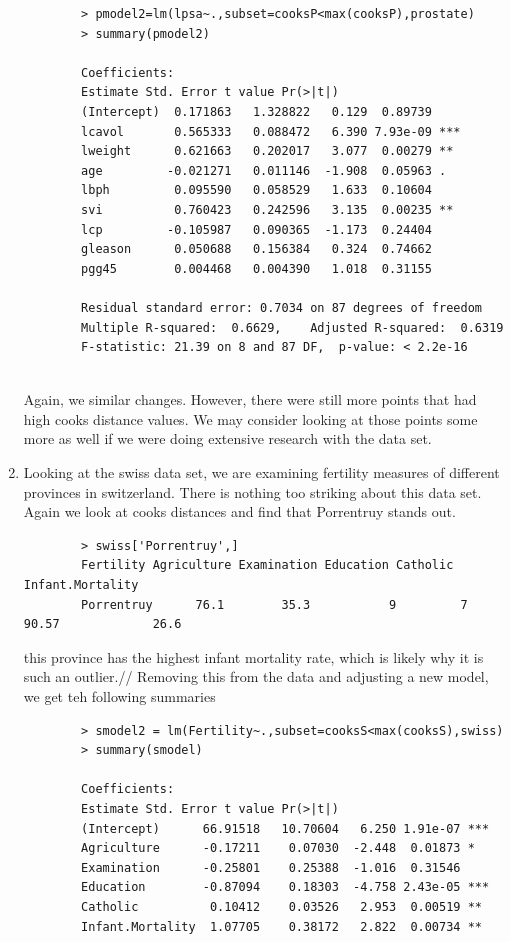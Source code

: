 \documentclass[11pt]{article}
\begin{document}
\begin{enumerate}
\begin{verbatim}
		> pmodel2=lm(lpsa~.,subset=cooksP<max(cooksP),prostate)
		> summary(pmodel2)
		
		Coefficients:
		Estimate Std. Error t value Pr(>|t|)    
		(Intercept)  0.171863   1.328822   0.129  0.89739    
		lcavol       0.565333   0.088472   6.390 7.93e-09 ***
		lweight      0.621663   0.202017   3.077  0.00279 ** 
		age         -0.021271   0.011146  -1.908  0.05963 .  
		lbph         0.095590   0.058529   1.633  0.10604    
		svi          0.760423   0.242596   3.135  0.00235 ** 
		lcp         -0.105987   0.090365  -1.173  0.24404    
		gleason      0.050688   0.156384   0.324  0.74662    
		pgg45        0.004468   0.004390   1.018  0.31155    
		
		Residual standard error: 0.7034 on 87 degrees of freedom
		Multiple R-squared:  0.6629,	Adjusted R-squared:  0.6319 
		F-statistic: 21.39 on 8 and 87 DF,  p-value: < 2.2e-16
		
	\end{verbatim}
	Again, we similar changes. However, there were still more points that had high cooks distance values. We may consider looking at those points some more as well if we were doing extensive research with the data set.
	\item
	Looking at the swiss data set, we are examining fertility measures of different provinces in switzerland.
	There is nothing too striking about this data set. Again we look at cooks distances and find that Porrentruy stands out.
	\begin{verbatim}
		> swiss['Porrentruy',]
		Fertility Agriculture Examination Education Catholic Infant.Mortality
		Porrentruy      76.1        35.3           9         7    90.57             26.6
	\end{verbatim}
	 this province has the highest infant mortality rate, which is likely why it is such an outlier.//
	 Removing this from the data and adjusting a new model, we get teh following summaries
	 \begin{verbatim}
	 	> smodel2 = lm(Fertility~.,subset=cooksS<max(cooksS),swiss)
	 	> summary(smodel)
	 	
	 	Coefficients:
	 	Estimate Std. Error t value Pr(>|t|)    
	 	(Intercept)      66.91518   10.70604   6.250 1.91e-07 ***
	 	Agriculture      -0.17211    0.07030  -2.448  0.01873 *  
	 	Examination      -0.25801    0.25388  -1.016  0.31546    
	 	Education        -0.87094    0.18303  -4.758 2.43e-05 ***
	 	Catholic          0.10412    0.03526   2.953  0.00519 ** 
	 	Infant.Mortality  1.07705    0.38172   2.822  0.00734 ** 
	 	

\end{verbatim}
\end{enumerate}
\end{document}
